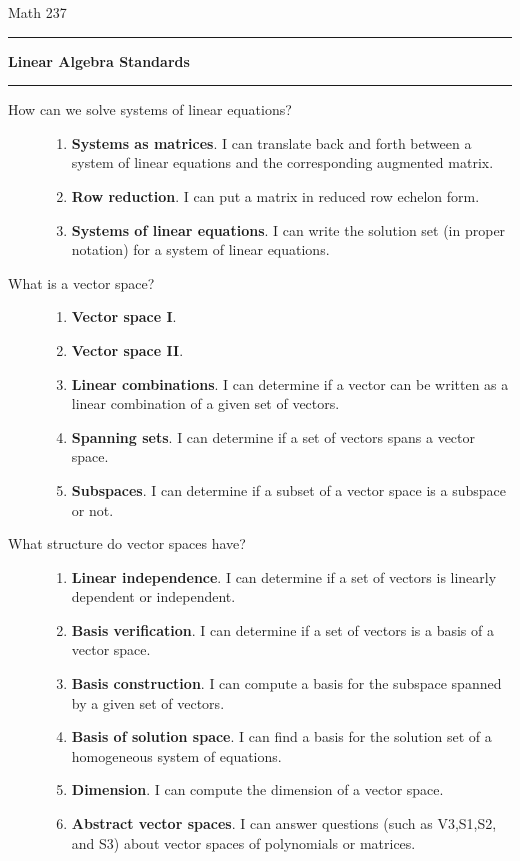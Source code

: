 
\usepackage[left=1in,right=1in,top=1in,bottom=1in]{geometry}
\usepackage{enumerate,amssymb}


\pagestyle{empty}
\noindent Math 237 \hfill \sem \hfill \prof
\vspace{0.3in}
\hrule
\begin{center}{\large \bf Linear Algebra Standards}\end{center}
\hrule


\begin{description}
\item[How can we solve systems of linear equations?] \hfill
\begin{enumerate}
\item {\bf Systems as matrices}. I can translate back and forth between a system of linear equations and the corresponding augmented matrix.
\item {\bf Row reduction}.  I can put a matrix in reduced row echelon form.
\item {\bf Systems of linear equations}. I can write the solution set (in proper notation) for a system of linear equations.
\end{enumerate}

\item[What is a vector space?] \hfill
\begin{enumerate}
\item {\bf Vector space I}. 
\item {\bf Vector space II}. 
\item {\bf Linear combinations}. I can determine if a vector can be written as a linear combination of a given set of vectors.
\item {\bf Spanning sets}. I can determine if a set of vectors spans a vector space.
\item {\bf Subspaces}. I can determine if a subset of a vector space is a subspace or not.

\end{enumerate}

\item [What structure do vector spaces have?] \hfill
\begin{enumerate}

\item {\bf Linear independence}. I can determine if a set of vectors is linearly dependent or independent.
\item {\bf Basis verification}. I can determine if a set of vectors is a basis of a vector space.
\item {\bf Basis construction}.  I can compute a basis for the subspace spanned by a given set of vectors.
\item {\bf Basis of solution space}. I can find a basis for the solution set of a homogeneous system of equations.
\item {\bf Dimension}.  I can compute the dimension of a vector space.
\item {\bf Abstract vector spaces}.  I can answer questions (such as V3,S1,S2, and S3) about vector spaces of polynomials or matrices.
\end{enumerate}


\end{description}
